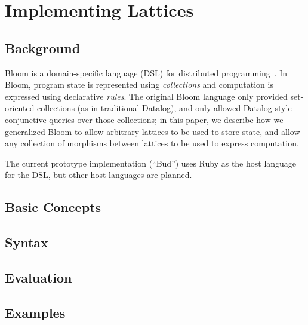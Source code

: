 \section{Implementing Lattices}

\subsection{Background}
Bloom is a domain-specific language (DSL) for distributed
programming~\cite{Alvaro2011,bloom}. In Bloom, program state is represented
using \emph{collections} and computation is expressed using declarative
\emph{rules}. The original Bloom language only provided set-oriented collections
(as in traditional Datalog), and only allowed Datalog-style conjunctive queries
over those collections; in this paper, we describe how we generalized Bloom to
allow arbitrary lattices to be used to store state, and allow any collection of
morphisms between lattices to be used to express computation.

The current prototype implementation (``Bud'') uses Ruby as the host language
for the DSL, but other host languages are planned.

\subsection{Basic Concepts}

\subsection{Syntax}

\subsection{Evaluation}

\subsection{Examples}
